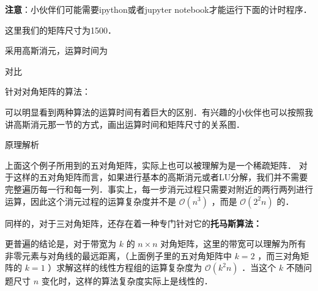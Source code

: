 \textbf{注意}：小伙伴们可能需要ipython或者jupyter notebook才能运行下面的计时程序．

这里我们的矩阵尺寸为1500．

采用高斯消元，运算时间为

对比

针对对角矩阵的算法：

可以明显看到两种算法的运算时间有着巨大的区别．有兴趣的小伙伴也可以按照我讲高斯消元那一节的方式，画出运算时间和矩阵尺寸的关系图．

原理解析

上面这个例子所用到的五对角矩阵，实际上也可以被理解为是一个稀疏矩阵． 对于这样的五对角矩阵而言，如果进行基本的高斯消元或者LU分解，我们并不需要完整遍历每一行和每一列．事实上，每一步消元过程只需要对附近的两行两列进行运算，因此这个消元过程的运算复杂度并不是  $\mathcal{O}(n^3)$  ，而是  $\mathcal{O}(2^2n)$  的．

同样的，对于三对角矩阵，还存在着一种专门针对它的\textbf{托马斯算法：}

更普遍的结论是，对于带宽为  $k$  的  $n\times n$  对角矩阵，这里的带宽可以理解为所有非零元素与对角线的最远距离，（上面例子里的五对角矩阵中  $k=2$  ，而三对角矩阵的  $k=1$  ）求解这样的线性方程组的运算复杂度为  $\mathcal{O}(k^2n)$  ．当这个  $k$  不随问题尺寸  $n $  变化时，这样的算法复杂度实际上是线性的．
